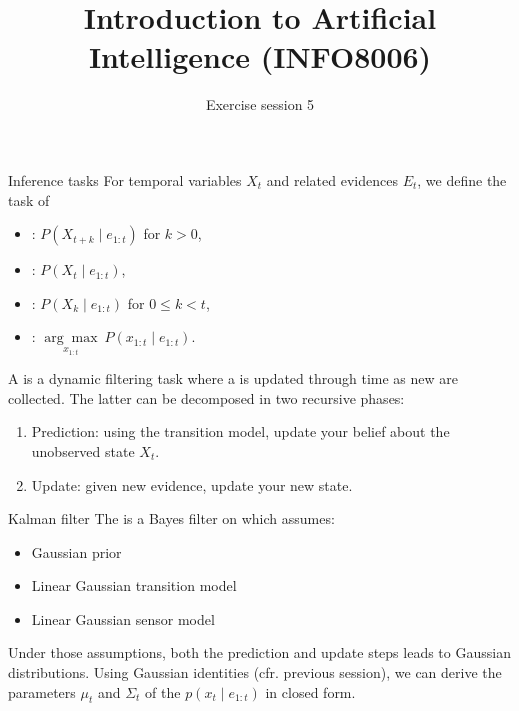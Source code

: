 \documentclass[11pt, a4paper]{article}
\title{Introduction to Artificial Intelligence (INFO8006)}
\subtitle{Exercise session 5}
\begin{document}
\maketitle

\begin{thbox}{Inference tasks}
    For  temporal variables $X_t$ and related  evidences $E_t$, we define the task of
    \begin{itemize}
        \item {}: $P(X_{t+k}\mid e_{1:t})$ for $k> 0$,
        \item {}: $P(X_t\mid e_{1:t})$,
        \item {}: $P(X_k\mid e_{1:t})$ for $0\leq k < t$,
        \item {}: $\underset{x_{1:t}}{\arg \max}\ P(x_{1:t}\mid e_{1:t}).$
    \end{itemize}
    A  is a dynamic filtering task where a  is updated through time as new  are collected. The latter can be decomposed in two recursive phases:\\
    
    \begin{enumerate}
        \item Prediction: using the transition model, update your belief about the unobserved state $X_t$.
        \item Update: given new evidence, update your new state.
    \end{enumerate}
\end{thbox}

\begin{thbox}{Kalman filter}
    The  is a Bayes filter on  which assumes:
    \begin{itemize}
        \item Gaussian prior
        \item Linear Gaussian transition model
        \item Linear Gaussian sensor model
    \end{itemize}
    Under those assumptions, both the prediction and update steps leads to Gaussian distributions. Using Gaussian identities (cfr. previous session), we can derive the parameters $\mu_t$ and $\Sigma_t$ of the  $p(x_t\mid e_{1:t})$ in closed form.
\end{thbox}
\end{document}
